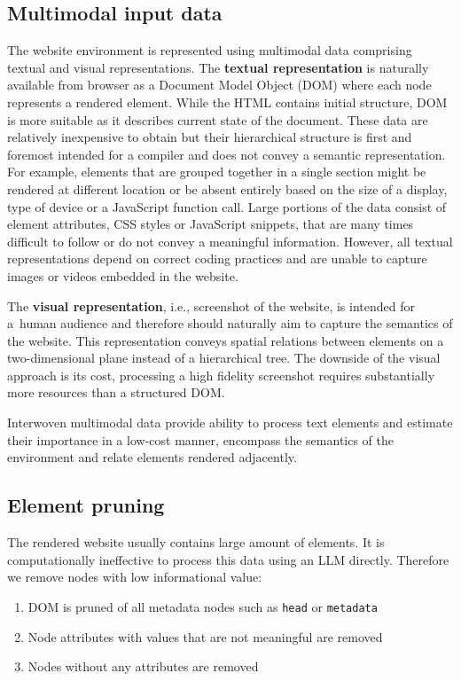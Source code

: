 \subsection{Multimodal input data}\label{subsection:input}
The website environment is represented using multimodal data comprising textual and visual representations.
The \textbf{textual representation} is naturally available from browser as a Document Model Object (DOM) where each node represents a rendered element. While the HTML contains initial structure, DOM is more suitable as it describes current state of the document. These data are relatively inexpensive to obtain but their hierarchical structure is first and foremost intended for a compiler and does not convey a semantic representation. For example, elements that are grouped together in a single section might be rendered at different location or be absent entirely based on the size of a display, type of device or a JavaScript function call. Large portions of the data consist of element attributes, CSS styles or JavaScript snippets, that are many times difficult to follow or do not convey a meaningful information. However, all textual representations depend on correct coding practices and are unable to capture images or videos embedded in the website.

The \textbf{visual representation}, i.e., screenshot of the website, is intended for a~human audience and therefore should naturally aim to capture the semantics of the website. This representation conveys spatial relations between elements on a two-dimensional plane instead of a hierarchical tree. The downside of the visual approach is its cost, processing a high fidelity screenshot requires substantially more resources than a structured DOM. 

Interwoven multimodal data provide ability to process text elements and estimate their importance in a low-cost manner, encompass the semantics of the environment and relate elements rendered adjacently.

\subsection{Element pruning}\label{subsection:pruning}
The rendered website usually contains large amount of elements. It is computationally ineffective to process this data using an LLM directly. Therefore we remove nodes with low informational value:
\begin{enumerate}
    \item DOM is pruned of all metadata nodes such as \texttt{head} or \texttt{metadata}
    \item Node attributes with values that are not meaningful are removed
    \item Nodes without any attributes are removed
\end{enumerate}

